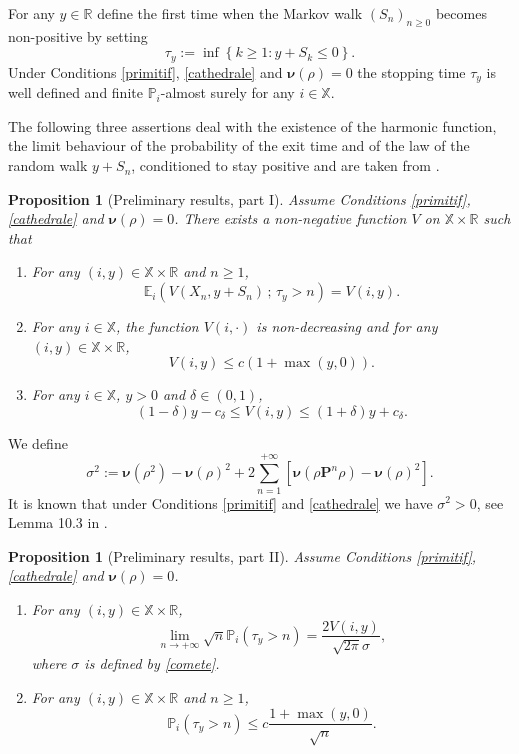 \documentclass[12pt]{amsart}
\newtheorem{proposition}[theorem]{Proposition}
\theoremstyle{definition}
\numberwithin{equation}{section}
\def\bb#1{\mathbb{#1}}
\def\bs#1{\boldsymbol{#1}}
\def\bf#1{\mathbf{#1}}
\def\geq{\geqslant}
\def\leq{\leqslant}
\begin{document}
For any $y \in \bb R$ define the first time when the Markov walk $\left( S_n \right)_{n\geq 0}$ becomes non-positive by setting
\[
\tau_y := \inf \left\{ k \geq 1 : y+S_k \leq 0 \right\}.
\]
Under Conditions \ref{primitif}, \ref{cathedrale} and $\bs \nu(\rho) = 0$ the stopping time $\tau_y$ is well defined and finite $\bb P_i$-almost surely for any $i \in \bb X$. 

The following three assertions deal with the existence of the harmonic function, the limit behaviour of the probability of the exit time and of the law of the random walk $y+S_n$, conditioned to stay positive and are taken from \cite{grama_limit_2016-1}.
\begin{proposition}[Preliminary results, part I] 
Assume Conditions \ref{primitif}, \ref{cathedrale} and $\bs \nu(\rho) = 0$.
\label{sable}
There exists a non-negative function $V$ on $\bb X \times \bb R$ such that
\begin{enumerate}[ref=\arabic*, leftmargin=*, label=\arabic*.]
	\item \label{sable001} For any $(i,y) \in \bb X \times \bb R$ and $n \geq 1$,
	\[
	\bb E_i \left( V \left( X_n, y+S_n \right) \,;\, \tau_y > n \right) = V(i,y).
	\]
	\item \label{sable002} For any $i\in \bb X$, the function $V(i,\cdot)$ is non-decreasing and for any $(i,y) \in \bb X \times \bb R$,
	\[
	V(i,y) \leq c \left( 1+\max(y,0) \right).
	\]
	\item \label{sable003} For any $i \in \bb X$, $y > 0$ and $\delta \in (0,1)$,
	\[
	\left( 1- \delta \right)y - c_{\delta} \leq V(i,y) \leq \left(1+\delta \right)y + c_{\delta}.
	\]
\end{enumerate}
\end{proposition}

We define
\begin{equation}
\label{comete}
\sigma^2 := \bs \nu \left( \rho^2 \right) -  \bs \nu \left( \rho \right)^2 + 2 \sum_{n=1}^{+\infty} \left[ \bs \nu \left( \rho \bf P^n \rho \right) -  \bs \nu \left( \rho \right)^2 \right].
\end{equation}
It is known that under Conditions \ref{primitif} and \ref{cathedrale} we have $\sigma^2 > 0$, see Lemma 10.3 in \cite{GLLP_CLLT_2017}.

\begin{proposition}[Preliminary results, part II] 
Assume Conditions \ref{primitif}, \ref{cathedrale} and $\bs \nu(\rho) = 0$.
\begin{enumerate}[ref=\arabic*, leftmargin=*, label=\arabic*.]
\label{oreiller}
	\item \label{oreiller001} For any $(i,y) \in \bb X \times \bb R$,
	\[
	\lim_{n\to +\infty} \sqrt{n} \bb P_i \left( \tau_y > n \right) = \frac{2V(i,y)}{\sqrt{2\pi} \sigma},
	\]
	where $\sigma$ is defined by \eqref{comete}.
	\item \label{oreiller002} For any $(i,y) \in \bb X \times \bb R$ and $n\geq 1$,
	\[
	\bb P_i \left( \tau_y > n \right) \leq c\frac{ 1 + \max(y,0) }{\sqrt{n}}.
	\]
\end{enumerate}
\end{proposition}
\end{document}
